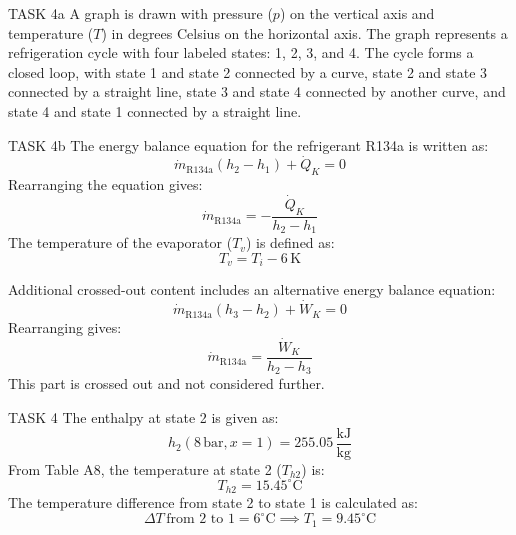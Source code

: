 TASK 4a  
A graph is drawn with pressure (\( p \)) on the vertical axis and temperature (\( T \)) in degrees Celsius on the horizontal axis. The graph represents a refrigeration cycle with four labeled states: 1, 2, 3, and 4. The cycle forms a closed loop, with state 1 and state 2 connected by a curve, state 2 and state 3 connected by a straight line, state 3 and state 4 connected by another curve, and state 4 and state 1 connected by a straight line.  

TASK 4b  
The energy balance equation for the refrigerant R134a is written as:  
\[
\dot{m}_{\text{R134a}} (h_2 - h_1) + \dot{Q}_K = 0
\]  
Rearranging the equation gives:  
\[
\dot{m}_{\text{R134a}} = -\frac{\dot{Q}_K}{h_2 - h_1}
\]  
The temperature of the evaporator (\( T_v \)) is defined as:  
\[
T_v = T_i - 6 \, \text{K}
\]  

Additional crossed-out content includes an alternative energy balance equation:  
\[
\dot{m}_{\text{R134a}} (h_3 - h_2) + \dot{W}_K = 0
\]  
Rearranging gives:  
\[
\dot{m}_{\text{R134a}} = \frac{\dot{W}_K}{h_2 - h_3}
\]  
This part is crossed out and not considered further.  

TASK 4  
The enthalpy at state 2 is given as:  
\[
h_2 (8 \, \text{bar}, x = 1) = 255.05 \, \frac{\text{kJ}}{\text{kg}}
\]  
From Table A8, the temperature at state 2 (\( T_{h2} \)) is:  
\[
T_{h2} = 15.45^\circ\text{C}
\]  
The temperature difference from state 2 to state 1 is calculated as:  
\[
\Delta T \, \text{from 2 to 1} = 6^\circ\text{C} \implies T_1 = 9.45^\circ\text{C}
\]